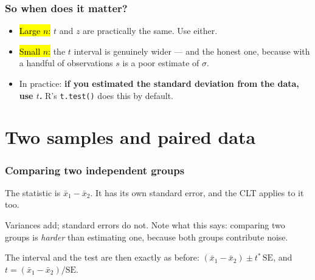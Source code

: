 \documentclass[slidestop,compress,mathserif]{beamer}
\begin{document}
\begin{frame}
\frametitle{So when does it matter?}

\begin{itemize}
\item \hl{Large $n$:} $t$ and $z$ are practically the same. Use either.
\item \hl{Small $n$:} the $t$ interval is genuinely wider --- and the honest one, because with a handful of observations $s$ is a poor estimate of $\sigma$.
\item In practice: \textbf{if you estimated the standard deviation from the data, use $t$.} R's \texttt{t.test()} does this by default.
\end{itemize}

\vspace{0.4em}

\end{frame}

\section{Two samples and paired data}
\begin{frame}
\frametitle{Comparing two independent groups}

The statistic is $\bar{x}_1 - \bar{x}_2$. It has its own standard error, and the CLT applies to it too.

\vspace{0.2em}

\vspace{0.2em}
{\small Variances add; standard errors do not. Note what this says: comparing two groups is \emph{harder} than estimating one, because both groups contribute noise.}

\vspace{0.2em}
The interval and the test are then exactly as before: $(\bar{x}_1 - \bar{x}_2) \pm t^{*}\,\mathrm{SE}$, and $t = (\bar{x}_1 - \bar{x}_2)/\mathrm{SE}$.

\end{frame}
\end{document}
